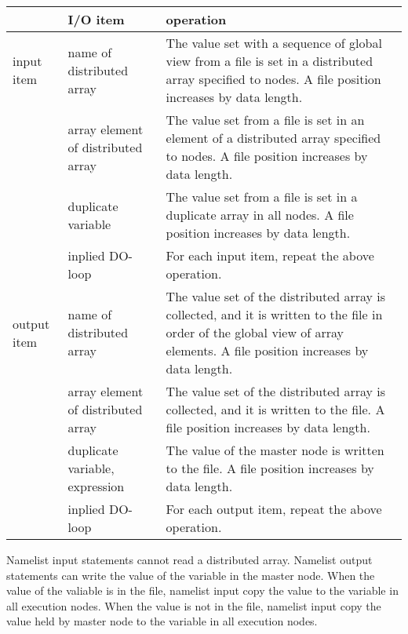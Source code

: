    \begin{table}[h]
    \begin{center}
     \begin{tabular}{|l|l|p{40mm}|}
      \hline
      \multicolumn{1}{|c}{ }  & {\bf I/O item} & {\bf operation} \\
      \hline
      input item & name of distributed array & The value set with a sequence
	      of global view from a file is set in a distributed
	      array specified to nodes. A file position increases by
	      data length. \\
      \cline{2-3}
      & array element of distributed array & The value set from a file
	      is set in an element of a distributed array specified to
	      nodes. A file position increases by data length. \\
      \cline{2-3}
      & duplicate variable &  The value set from a file is set in a
	      duplicate array in all nodes. A file position increases by
	      data length. \\
      \cline{2-3}
      & inplied DO-loop & For each input item, repeat the above operation. \\
      \hline
      output item & name of distributed array & The value set of the
	      distributed array is collected, and it is written to the
	      file in order of the global view of array elements. A file
	      position increases by data length. \\
      \cline{2-3}
      & array element of distributed array &  The value set of the
	      distributed array is collected, and it is written to the
	      file. A file position increases by data length. \\
      \cline{2-3}
      & duplicate variable, expression & The value of the master node
	      is written to the file.  A file position increases by data
	      length. \\
      \cline{2-3}
      & inplied DO-loop & For each output item, repeat the above operation. \\
      \hline
      \end{tabular}
     \end{center}
    \label{tb:aaa}
   \end{table}

   Namelist input statements cannot read a distributed array. Namelist
   output statements can write the value of the variable in the master
   node. When the value of the valiable is in the file, namelist input
   copy the value to the variable in all execution nodes. When the value
   is not in the file, namelist input copy the value held by master node
   to the variable in all execution nodes.

